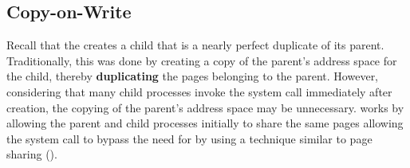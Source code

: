 \subsection{Copy-on-Write}\label{subsec:Memory_Copy_on_Write}
Recall that the   creates a child  that is a nearly perfect duplicate of its parent.
Traditionally, this was done by creating a copy of the parent’s address space for the child, thereby \textbf{duplicating} the pages belonging to the parent.
However, considering that many child processes invoke the  system call immediately after creation, the copying of the parent’s address space may be unnecessary.
 works by allowing the parent and child processes initially to share the same pages allowing the  system call to bypass the need for  by using a technique similar to page sharing ().


